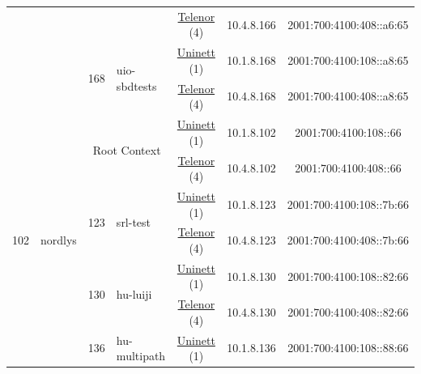 \begin{small}
\begin{center}
\begin{longtable}{|c|c|c|c|c|c|c|c|}
  &  &  &  & \multicolumn{2}{|c|}{\tiny{\href{https://www.telenor.no}{Telenor} (4)}} & \tiny{10.4.8.166} & \tiny{2001:700:4100:408::a6:65} \\* \cline{3-3}\cline{4-4}\cline{5-5}\cline{6-6}\cline{7-7}\cline{8-8}
  &  & \multirow{2}{*}{\tiny{168}} & \multicolumn{1}{|l|}{\multirow{2}{*}{\tiny{uio-sbdtests}}} & \multicolumn{2}{|c|}{\tiny{\href{https://www.uninett.no}{Uninett} (1)}} & \tiny{10.1.8.168} & \tiny{2001:700:4100:108::a8:65} \\* \cline{5-5}\cline{6-6}\cline{7-7}\cline{8-8}
  &  &  &  & \multicolumn{2}{|c|}{\tiny{\href{https://www.telenor.no}{Telenor} (4)}} & \tiny{10.4.8.168} & \tiny{2001:700:4100:408::a8:65} \\ \hline
 \multirow{22}{*}{\tiny{102}} & \multicolumn{1}{|l|}{\multirow{22}{*}{\tiny{nordlys}}} & \multicolumn{2}{|c|}{\multirow{2}{*}{\tiny{Root Context}}} & \multicolumn{2}{|c|}{\tiny{\href{https://www.uninett.no}{Uninett} (1)}} & \tiny{10.1.8.102} & \tiny{2001:700:4100:108::66} \\* \cline{5-5}\cline{6-6}\cline{7-7}\cline{8-8}
  &  & \multicolumn{2}{|c|}{} & \multicolumn{2}{|c|}{\tiny{\href{https://www.telenor.no}{Telenor} (4)}} & \tiny{10.4.8.102} & \tiny{2001:700:4100:408::66} \\* \cline{3-3}\cline{4-4}\cline{5-5}\cline{6-6}\cline{7-7}\cline{8-8}
  &  & \multirow{2}{*}{\tiny{123}} & \multicolumn{1}{|l|}{\multirow{2}{*}{\tiny{srl-test}}} & \multicolumn{2}{|c|}{\tiny{\href{https://www.uninett.no}{Uninett} (1)}} & \tiny{10.1.8.123} & \tiny{2001:700:4100:108::7b:66} \\* \cline{5-5}\cline{6-6}\cline{7-7}\cline{8-8}
  &  &  &  & \multicolumn{2}{|c|}{\tiny{\href{https://www.telenor.no}{Telenor} (4)}} & \tiny{10.4.8.123} & \tiny{2001:700:4100:408::7b:66} \\* \cline{3-3}\cline{4-4}\cline{5-5}\cline{6-6}\cline{7-7}\cline{8-8}
  &  & \multirow{2}{*}{\tiny{130}} & \multicolumn{1}{|l|}{\multirow{2}{*}{\tiny{hu-luiji}}} & \multicolumn{2}{|c|}{\tiny{\href{https://www.uninett.no}{Uninett} (1)}} & \tiny{10.1.8.130} & \tiny{2001:700:4100:108::82:66} \\* \cline{5-5}\cline{6-6}\cline{7-7}\cline{8-8}
  &  &  &  & \multicolumn{2}{|c|}{\tiny{\href{https://www.telenor.no}{Telenor} (4)}} & \tiny{10.4.8.130} & \tiny{2001:700:4100:408::82:66} \\* \cline{3-3}\cline{4-4}\cline{5-5}\cline{6-6}\cline{7-7}\cline{8-8}
  &  & \multirow{2}{*}{\tiny{136}} & \multicolumn{1}{|l|}{\multirow{2}{*}{\tiny{hu-multipath}}} & \multicolumn{2}{|c|}{\tiny{\href{https://www.uninett.no}{Uninett} (1)}} & \tiny{10.1.8.136} & \tiny{2001:700:4100:108::88:66} \\* \cline{5-5}\cline{6-6}\cline{7-7}\cline{8-8}

\end{longtable}
\end{center}
\end{small}
